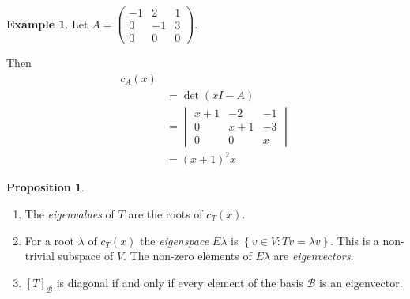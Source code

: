 \documentclass{article}
\theoremstyle{definition} \newtheorem*{definition}{Definition}
\newtheorem{proposition}[theorem]{Proposition}
\newtheorem*{exmp}{Example} \newtheorem*{exmps}{Examples}
\newcommand{\B}{\mathcal{B}}
\begin{document}
\begin{exmp}
  Let $A = \left( 
  \begin{matrix}
    -1 & 2 & 1 \\
    0 & -1 & 3 \\
    0 & 0 & 0
  \end{matrix}
  \right)$. 
  
  Then 
  \begin{align*}
  c_A(x) \\ &= \det(xI - A) \\
  &= 
  \begin{vmatrix}
    x+1 & -2 & -1 \\
    0 & x+1 & -3 \\
    0 & 0 & x
  \end{vmatrix}\\
   &= (x+1)^2 x
  \end{align*}
\end{exmp}

\begin{proposition}
  \hfill
  \begin{enumerate}
    \item The \emph{eigenvalues} of $T$ are the roots of $c_T(x)$.
    \item For a root $\lambda$ of $c_T(x)$ the \emph{eigenspace}
      $E\lambda$ is $\left\{ v \in V : Tv = \lambda v \right\}$.
      This is a non-trivial subspace of $V$. The non-zero elements
      of $E\lambda$ are \emph{eigenvectors}.
    \item $[T]_\B$ is diagonal if and only if every element of the basis
      $\B$ is an eigenvector.\\
  \end{enumerate}
\end{proposition}
\end{document}
